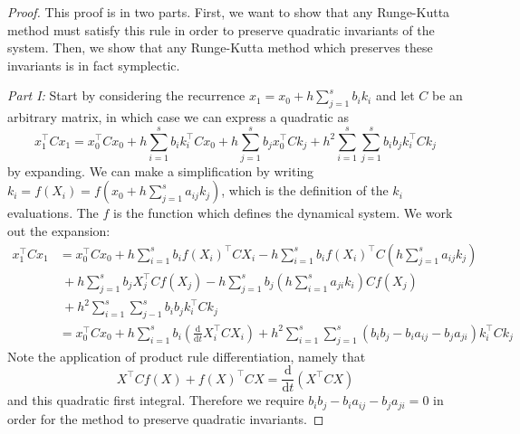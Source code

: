 \documentclass{report}
\theoremstyle{exampstyle} \newtheorem{example}[theorem]{Example}
\theoremstyle{exampstyle} \newtheorem{remark}[theorem]{Remark}
\theoremstyle{exampstyle} \newtheorem{definition}[theorem]{Definition}
\theoremstyle{exampstyle} \newtheorem{lemma}[theorem]{Lemma}
\theoremstyle{exampstyle} \newtheorem{proposition}[theorem]{Proposition}
\begin{document}
\begin{proof}

This proof is in two parts. First, we want to show that any Runge-Kutta method must satisfy this rule in order to preserve quadratic invariants of the system.
Then, we show that any Runge-Kutta method which preserves these invariants is in fact symplectic.

\textit{Part I:}
Start by considering the recurrence $x_1 = x_0 + h \sum_{j=1}^{s} b_i k_i$ and let $C$ be an arbitrary matrix, in which case we can express a quadratic as
\begin{equation}
	x_1^\intercal C x_1 = x_0^\intercal C x_0 + h \sum_{i=1}^{s} b_i k_i^\intercal C x_0 + h \sum_{j=1}^{s} b_j x_0^\intercal C k_j + h^2 \sum_{i=1}^{s} \sum_{j=1}^{s} b_i b_j k_i^\intercal C k_j
\end{equation} %
by expanding. We can make a simplification by writing $k_i = f(X_i) = f\left(x_0 + h \sum_{j=1}^{s}a_{ij}k_j\right)$, which is the definition of the $k_i$ evaluations.
The $f$ is the function which defines the dynamical system.
We work out the expansion:
\begin{align*}
	x_1^\intercal C x_1 &= x_0^\intercal C x_0 + h \sum_{i = 1}^{s} b_i f(X_i)^\intercal C X_i - h \sum_{i=1}^{s}b_i f(X_i)^\intercal C \left( h\sum_{j=1}^{s}a_{ij} k_j \right) \\
	&~ +h \sum_{j = 1}^{s} b_j X_j^\intercal C f(X_j) - h \sum_{j=1}^{s}b_j \left( h\sum_{i=1}^{s}a_{ji} k_i \right) C f(X_j) \\
	&~ + h^2 \sum_{i=1}^{s} \sum_{j-1}^{s} b_i b_j k_i^\intercal C k_j \\
	&= x_0^\intercal C x_0 + h \sum_{i=1}^{s} b_i \left(
		\frac{\mathrm{d}}{\mathrm{d}t} X_i^\intercal C X_i
	\right) + h^2 \sum_{i=1}^{s} \sum_{j=1}^{s} (b_i b_j - b_i a_{ij} - b_j a_{ji})k_i^\intercal C k_j
\end{align*}
Note the application of product rule differentiation, namely that
\begin{equation*}
	X^\intercal C f(X) + f(X)^\intercal C X = \frac{\mathrm{d}}{\mathrm{d}t} (X^\intercal C X)
\end{equation*}
and this quadratic first integral.
Therefore we require $b_i b_j - b_i a_{ij} - b_j a_{ji} = 0$ in order for the method to preserve quadratic invariants.


\end{proof}
\end{document}
